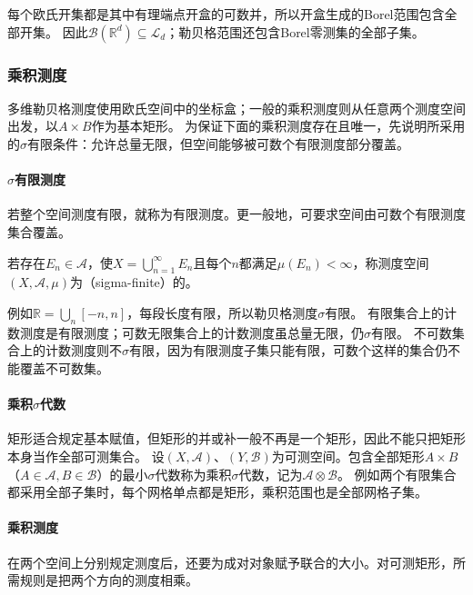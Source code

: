 每个欧氏开集都是其中有理端点开盒的可数并，所以开盒生成的Borel范围包含全部开集。
因此$\mathcal B(\mathbb R^d)\subseteq\mathcal L_d$；勒贝格范围还包含Borel零测集的全部子集。

\subsubsection{乘积测度}

多维勒贝格测度使用欧氏空间中的坐标盒；一般的乘积测度则从任意两个测度空间出发，以$A\times B$作为基本矩形。
为保证下面的乘积测度存在且唯一，先说明所采用的$\sigma$有限条件：允许总量无限，但空间能够被可数个有限测度部分覆盖。

\paragraph{$\sigma$有限测度}

若整个空间测度有限，就称为有限测度。更一般地，可要求空间由可数个有限测度集合覆盖。
\begin{definition}
\label{def:analysis-sigma-finite-measure}
若存在$E_n\in\mathcal A$，使$X=\bigcup_{n=1}^{\infty}E_n$且每个$n$都满足$\mu(E_n)<\infty$，称测度空间$(X,\mathcal A,\mu)$为（sigma-finite）的。
\end{definition}

例如$\mathbb R=\bigcup_n[-n,n]$，每段长度有限，所以勒贝格测度$\sigma$有限。
有限集合上的计数测度是有限测度；可数无限集合上的计数测度虽总量无限，仍$\sigma$有限。
不可数集合上的计数测度则不$\sigma$有限，因为有限测度子集只能有限，可数个这样的集合仍不能覆盖不可数集。

\paragraph{乘积$\sigma$代数}

矩形适合规定基本赋值，但矩形的并或补一般不再是一个矩形，因此不能只把矩形本身当作全部可测集合。
设$(X,\mathcal A)$、$(Y,\mathcal B)$为可测空间。包含全部矩形$A\times B$
（$A\in\mathcal A,B\in\mathcal B$）的最小$\sigma$代数称为乘积$\sigma$代数，记为$\mathcal A\otimes\mathcal B$。
例如两个有限集合都采用全部子集时，每个网格单点都是矩形，乘积范围也是全部网格子集。

\paragraph{乘积测度}

在两个空间上分别规定测度后，还要为成对对象赋予联合的大小。对可测矩形，所需规则是把两个方向的测度相乘。


